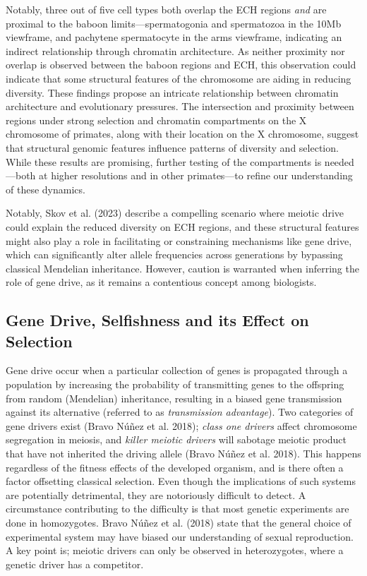 \documentclass[
  11pt,
  a4paper,
]{scrbook}
\begin{document}
Notably, three out of five cell types both overlap the ECH regions
\emph{and} are proximal to the baboon limits---spermatogonia and
spermatozoa in the 10Mb viewframe, and pachytene spermatocyte in the
arms viewframe, indicating an indirect relationship through chromatin
architecture. As neither proximity nor overlap is observed between the
baboon regions and ECH, this observation could indicate that some
structural features of the chromosome are aiding in reducing diversity.
These findings propose an intricate relationship between chromatin
architecture and evolutionary pressures. The intersection and proximity
between regions under strong selection and chromatin compartments on the
X chromosome of primates, along with their location on the X chromosome,
suggest that structural genomic features influence patterns of diversity
and selection. While these results are promising, further testing of the
compartments is needed---both at higher resolutions and in other
primates---to refine our understanding of these dynamics.

Notably, Skov et al. (2023) describe a compelling scenario where meiotic
drive could explain the reduced diversity on ECH regions, and these
structural features might also play a role in facilitating or
constraining mechanisms like gene drive, which can significantly alter
allele frequencies across generations by bypassing classical Mendelian
inheritance. However, caution is warranted when inferring the role of
gene drive, as it remains a contentious concept among biologists.

\subsection{Gene Drive, Selfishness and its Effect on
Selection}\label{gene-drive-selfishness-and-its-effect-on-selection}

Gene drive occur when a particular collection of genes is propagated
through a population by increasing the probability of transmitting genes
to the offspring from random (Mendelian) inheritance, resulting in a
biased gene transmission against its alternative (referred to as
\emph{transmission advantage}). Two categories of gene drivers exist
(Bravo Núñez et al. 2018); \emph{class one drivers} affect chromosome
segregation in meiosis, and \emph{killer meiotic drivers} will sabotage
meiotic product that have not inherited the driving allele (Bravo Núñez
et al. 2018). This happens regardless of the fitness effects of the
developed organism, and is there often a factor offsetting classical
selection. Even though the implications of such systems are potentially
detrimental, they are notoriously difficult to detect. A circumstance
contributing to the difficulty is that most genetic experiments are done
in homozygotes. Bravo Núñez et al. (2018) state that the general choice
of experimental system may have biased our understanding of sexual
reproduction. A key point is; meiotic drivers can only be observed in
heterozygotes, where a genetic driver has a competitor.
\end{document}
